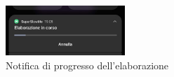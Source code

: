 \begin{figure}[p]
    \centering
    \includegraphics[width=0.4\textwidth]{img/screenshot_notifica.jpg}
    \caption{Notifica di progresso dell'elaborazione}
\end{figure}